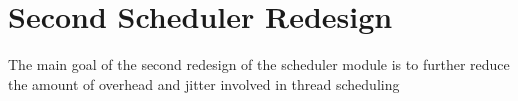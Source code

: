 \section{Second Scheduler Redesign}
\label{sec:build2}
The main goal of the second redesign of the scheduler module is to further
reduce the amount of overhead and jitter involved in thread scheduling
